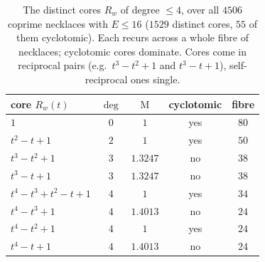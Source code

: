 \begin{table}[h]\centering\small\renewcommand{\arraystretch}{1.2}
\begin{tabular}{@{}lcccc@{}}
\toprule
core $R_w(t)$ & $\deg$ & $\mathrm{M}$ & cyclotomic & fibre\\
\midrule
$1$ & $0$ & $1$ & yes & $80$\\
$t^{2} - t + 1$ & $2$ & $1$ & yes & $50$\\
$t^{3} - t^{2} + 1$ & $3$ & $1.3247$ & no & $38$\\
$t^{3} - t + 1$ & $3$ & $1.3247$ & no & $38$\\
$t^{4} - t^{3} + t^{2} - t + 1$ & $4$ & $1$ & yes & $34$\\
$t^{4} - t^{3} + 1$ & $4$ & $1.4013$ & no & $24$\\
$t^{4} - t^{2} + 1$ & $4$ & $1$ & yes & $24$\\
$t^{4} - t + 1$ & $4$ & $1.4013$ & no & $24$\\
\bottomrule
\end{tabular}
\caption{The distinct cores $R_w$ of degree $\le4$, over all $4506$ coprime necklaces with $E\le16$ ($1529$ distinct cores, $55$ of them cyclotomic). Each recurs across a whole fibre of necklaces; cyclotomic cores dominate. Cores come in reciprocal pairs (e.g.\ $t^3-t^2+1$ and $t^3-t+1$), self-reciprocal ones single.}\label{tab:cores}
\end{table}
